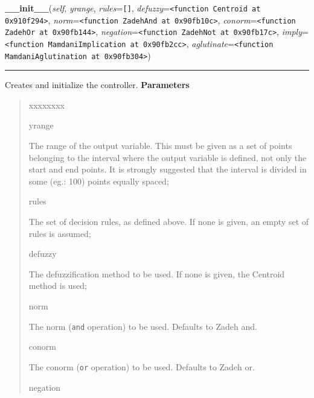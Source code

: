     \vspace{0.5ex}

\hspace{.8\funcindent}\begin{boxedminipage}{\funcwidth}

    \raggedright \textbf{\_\_init\_\_}(\textit{self}, \textit{yrange}, \textit{rules}={\tt \texttt{[}\texttt{]}}, \textit{defuzzy}={\tt {\textless}function Centroid at 0x910f294{\textgreater}}, \textit{norm}={\tt {\textless}function ZadehAnd at 0x90fb10c{\textgreater}}, \textit{conorm}={\tt {\textless}function ZadehOr at 0x90fb144{\textgreater}}, \textit{negation}={\tt {\textless}function ZadehNot at 0x90fb17c{\textgreater}}, \textit{imply}={\tt {\textless}function MamdaniImplication at 0x90fb2cc{\textgreater}}, \textit{aglutinate}={\tt {\textless}function MamdaniAglutination at 0x90fb304{\textgreater}})

    \vspace{-1.5ex}

    \rule{\textwidth}{0.5\fboxrule}
\setlength{\parskip}{2ex}

Creates and initialize the controller.
\setlength{\parskip}{1ex}
      \textbf{Parameters}
      \vspace{-1ex}

      \begin{quote}
        \begin{Ventry}{xxxxxxxx}

          \item[yrange]


The range of the output variable. This must be given as a set of
points belonging to the interval where the output variable is
defined, not only the start and end points. It is strongly suggested
that the interval is divided in some (eg.: 100) points equally
spaced;
          \item[rules]


The set of decision rules, as defined above. If none is given, an
empty set of rules is assumed;
          \item[defuzzy]


The defuzzification method to be used. If none is given, the
Centroid method is used;
          \item[norm]


The norm (\texttt{and} operation) to be used. Defaults to Zadeh and.
          \item[conorm]


The conorm (\texttt{or} operation) to be used. Defaults to Zadeh or.
          \item[negation]



\end{Ventry}
\end{quote}
\end{boxedminipage}
